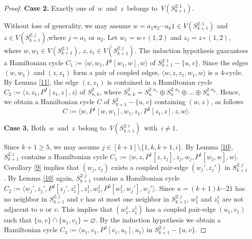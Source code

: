 \documentclass[12pt,a4paper]{amsart}
\theoremstyle{definition}
\begin{document}
\begin{proof}
	\textbf{Case 2.} Exactly one of~$w$~and~$z$~belongs to~$V(S_{k+1}^{2:1})$.

Without loss of generality, we may assume $w=a_1a_2\cdots a_k1\in V(S_{k+1}^{2:1})$ and $z\in V(S_{k+1}^{2:j})$,where $j=a_1$ or $a_2$.
Let $w_1=w\circ(1,2)$ and $z_1=z\circ(1,2)$, where $w,w_1\in V(S_{k+1}^{2:1})$, $z,z_1\in V(S_{k+1}^{2:j})$. The induction hypothesis guarantees a Hamiltonian cycle $C_1:=\langle w,w_1,P^1[w_1,w],w\rangle$ of $S_{k+1}^{2:1}-\{u,v\}$. Since the edges $(w,w_1)$ and $(z,z_1)$ form a pair of coupled edges, $\langle w,z,z_1,w_1,w\rangle$ is a $4$-cycle. By Lemma \ref{11}, the edge $(z,z_1)$ is contained in a Hamiltonian cycle $C_2:=\langle z,z_1,P^2[z_1,z],z \rangle$ of $S_{n,k}^2$, where $S_{n,k}^2=S_n^{2:a_1}\oplus S_n^{2:a_2}\oplus\dots\oplus S_n^{2:a_k}$. Hence, we obtain a Hamiltonian cycle $C$ of $S_{k+1}^2-\{u,v\}$ containing $(w,z)$, as follows
\[
C:=\langle w,P^1[w,w_1],w_1,z_1,P^2[z_1,z],z,w\rangle.
\]

	\textbf{Case 3.} Both~$w$~and~$z$~belong to~$V(S_{k+1}^{2:i})$~with~$i\neq 1$.

Since $k+1\ge5$, we may assume $j\in[k+1]\setminus\{1,k,k+1,i\}$. By Lemma \ref{10}, $S_{k+1}^{2:i}$ contains a Hamiltonian cycle $C_1:=\langle w,z,P^1[z,z_j],z_j,w_j,P^1[w_j,w],w\rangle$. Corollary \ref{9} implies that $(w_j,z_j)$ exists a coupled pair-edge $(w_j',z_j')$ in $S_{k+1}^{2:j}$. By Lemma \ref{10} again, $S_{k+1}^{2:j}$ contains a Hamiltonian cycle $C_2:=\langle w_j',z_j',P^2[z_j',z_1^{1}],z_1^{1},w_1^{1},P^2[w_1^{1},w_j'],w_j'\rangle$. Since $u=(k+1)k\cdots21$ has no neighbor in $S_{k+1}^{2:j}$ and $v$ has at most one neighbor in $S_{k+1}^{2:j}$, $w_1^1$ and $z_1^1$ are not adjacent to $u$ or $v$. This implies that $(w_1^{1},z_1^{1})$ has a coupled pair-edge $(u_1,v_1)$ such that $\{u,v\}\cap\{u_1,v_1\}=\varnothing$. By the induction hypothesis we obtain a Hamiltonian cycle $C_3:=\langle u_1,v_1,P^3[v_1,u_1],u_1\rangle$ in $S_{k+1}^{2:i}-\{u,v\}$.



\end{proof}
\end{document}
